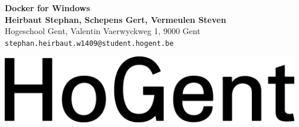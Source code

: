 \documentclass[a0,portrait]{a0poster}
\begin{document}


\begin{minipage}[t]{0.75\linewidth}
\VeryHuge \color{HoGentAccent1} \textbf{Docker for Windows} \color{Black}\\ %
\huge \textbf{Heirbaut Stephan, Schepens Gert, Vermeulen Steven}\\[0.5cm] %
\huge Hogeschool Gent, Valentin Vaerwyckweg 1, 9000 Gent\\[0.4cm] %
\Large \texttt{stephan.heirbaut.w1409@student.hogent.be} \\
\end{minipage}
%
\begin{minipage}[t]{0.25\linewidth}
\includegraphics[width=13cm,right]{figures/HG-woordmerk.jpg} 

\end{minipage}

\vspace{1cm} %

\end{document}
